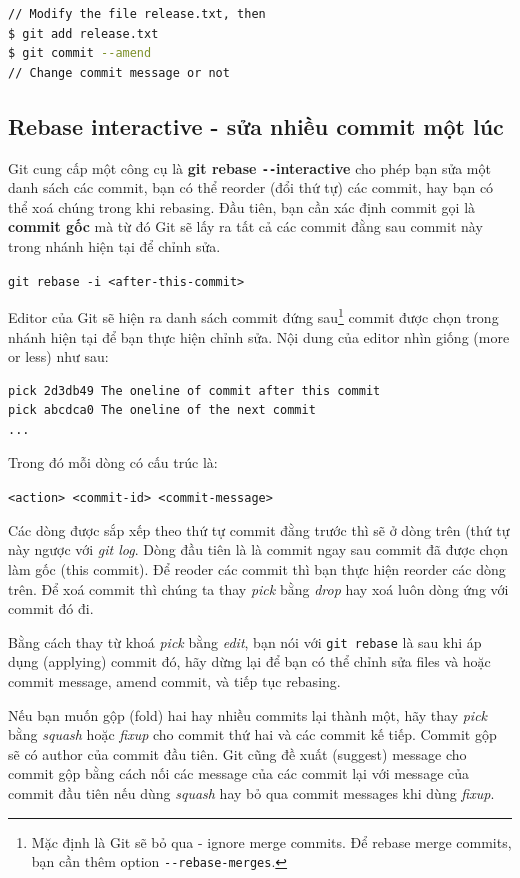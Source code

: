 \documentclass[a4paper, 11pt]{article}
\begin{document}
\begin{lstlisting}[language=bash]
// Modify the file release.txt, then
$ git add release.txt
$ git commit --amend
// Change commit message or not
\end{lstlisting}

\subsection{Rebase interactive - sửa nhiều commit một lúc}
Git cung cấp một công cụ là \textbf{git rebase \texttt{-{}-}interactive} cho phép bạn sửa một danh sách các commit,  bạn có thể reorder (đổi thứ tự) các commit, hay bạn có thể xoá chúng trong khi rebasing. Đầu tiên, bạn cần xác định commit gọi là \textbf{commit gốc} mà từ đó Git sẽ lấy ra tất cả các commit đằng sau commit này trong nhánh hiện tại để chỉnh sửa.

\texttt{git rebase -i <after-this-commit>}

\noindent Editor của Git sẽ hiện ra danh sách commit đứng sau\footnote{Mặc định là Git sẽ bỏ qua - ignore merge commits. Để rebase merge commits, bạn cần thêm option \texttt{-{}-rebase-merges}.} commit được chọn trong nhánh hiện tại để bạn thực hiện chỉnh sửa. Nội dung của editor nhìn giống (more or less) như sau:

\begin{verbatim}
pick 2d3db49 The oneline of commit after this commit
pick abcdca0 The oneline of the next commit
...
\end{verbatim}

\noindent Trong đó mỗi dòng có cấu trúc là:

 \texttt{<action> <commit-id> <commit-message>}
 
\noindent Các dòng được sắp xếp theo thứ tự commit đằng trước thì sẽ ở dòng trên (thứ tự này ngược với \textit{git log}. Dòng đầu tiên là là commit ngay sau commit đã được chọn làm gốc (this commit). Để reoder các commit thì bạn thực hiện reorder các dòng trên. Để xoá commit thì chúng ta thay \textit{pick} bằng \textit{drop} hay xoá luôn dòng ứng với commit đó đi.
  
Bằng cách thay từ khoá \textit{pick} bằng \textit{edit}, bạn nói với \texttt{git rebase} là sau khi áp dụng (applying) commit đó, hãy dừng lại để bạn có thể chỉnh sửa files và hoặc commit message, amend commit, và tiếp tục rebasing.

Nếu bạn muốn gộp (fold) hai hay nhiều commits lại thành một, hãy thay \textit{pick} bằng \textit{squash} hoặc \textit{fixup} cho commit thứ hai và các commit kế tiếp. Commit gộp sẽ có author của commit đầu tiên. Git cũng đề xuất (suggest) message cho commit gộp bằng cách nối các message của các commit lại với message của commit đầu tiên nếu dùng \textit{squash} hay bỏ qua commit messages khi dùng  \textit{fixup}. 
\end{document}

